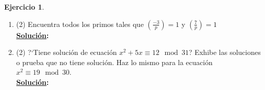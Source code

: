 \documentclass[11pt,letterpaper]{article}
\theoremstyle{definition}\newtheorem{p}{Ejercicio}
\newcommand{\leg}[2]{\left( \frac{#1}{#2}\right)} %
\newcommand{\sol}{\textbf{\underline{Solución}: }} %
\begin{document}
\begin{p}
\begin{enumerate}
\begin{itemize}
    \item $\leg{-1}{m}$ para $m>1$ impar.\\
    \sol $\leg{-1}{m}:$ son los residuos del los primeros $\frac{m-1}{2}$ mútiplos de -1 todos
    negativos, así $\leg{-1}{m} = (-1)^{\mu} = (-1)^{(p-1)/2}$.
  \end{itemize}

  \item(2) Encuentra todos los primos tales que $\left(\frac{-3}{p}\right)=1$
  y $\left(\frac{7}{p}\right)=1$\\
  \sol

  \item(2) ?`Tiene soluci\'on de ecuaci\'on $x^2+5x\equiv 12\mod 31$? Exhibe las soluciones o prueba
  que no tiene soluci\'on. Haz lo mismo para la ecuaci\'on $x^2\equiv 19\mod 30$.\\
  \sol

\end{enumerate}

\end{p}
\end{document}
